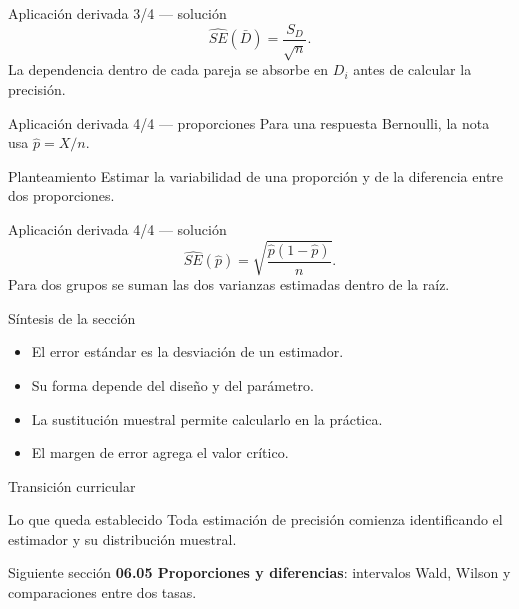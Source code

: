 \documentclass[10pt,aspectratio=169]{beamer}
\begin{document}
\begin{frame}{Aplicación derivada 3/4 --- solución}
  \footnotesize
  \[
    \widehat{SE}(\bar D)=\frac{S_D}{\sqrt n}.
  \]
  La dependencia dentro de cada pareja se absorbe en $D_i$ antes de calcular la
  precisión.
\end{frame}

\begin{frame}{Aplicación derivada 4/4 --- proporciones}
  \footnotesize
  Para una respuesta Bernoulli, la nota usa $\hat p=X/n$.
  \begin{block}{Planteamiento}
    Estimar la variabilidad de una proporción y de la diferencia entre dos
    proporciones.
  \end{block}
\end{frame}

\begin{frame}{Aplicación derivada 4/4 --- solución}
  \footnotesize
  \[
    \widehat{SE}(\hat p)=\sqrt{\frac{\hat p(1-\hat p)}{n}}.
  \]
  Para dos grupos se suman las dos varianzas estimadas dentro de la raíz.
\end{frame}

\begin{frame}{Síntesis de la sección}
  \footnotesize
  \begin{itemize}\itemsep=0.12cm
    \item El error estándar es la desviación de un estimador.
    \item Su forma depende del diseño y del parámetro.
    \item La sustitución muestral permite calcularlo en la práctica.
    \item El margen de error agrega el valor crítico.
  \end{itemize}
\end{frame}

\begin{frame}{Transición curricular}
  \footnotesize
  \begin{block}{Lo que queda establecido}
    Toda estimación de precisión comienza identificando el estimador y su
    distribución muestral.
  \end{block}
  \begin{alertblock}{Siguiente sección}
    \textbf{06.05 Proporciones y diferencias}: intervalos Wald, Wilson y
    comparaciones entre dos tasas.
  \end{alertblock}
\end{frame}
\end{document}
